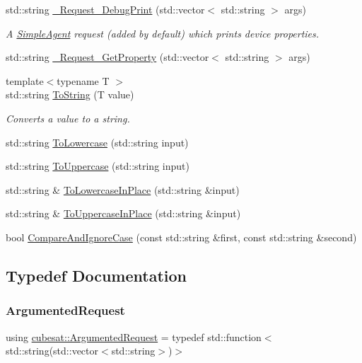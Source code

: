 \begin{DoxyCompactItemize}
std\+::string \hyperlink{namespacecubesat_a03e9fbf30b91d3d0992e8a539cbb855a}{\+\_\+\+Request\+\_\+\+Debug\+Print} (std\+::vector$<$ std\+::string $>$ args)
\begin{DoxyCompactList}\small\item\em A \hyperlink{classcubesat_1_1SimpleAgent}{Simple\+Agent} request (added by default) which prints device properties. \end{DoxyCompactList}\item 
std\+::string \hyperlink{namespacecubesat_a86fef60e77fb4edbec3c5bd8f99132b4}{\+\_\+\+Request\+\_\+\+Get\+Property} (std\+::vector$<$ std\+::string $>$ args)
\item 
{\footnotesize template$<$typename T $>$ }\\std\+::string \hyperlink{namespacecubesat_ac94d5b68f78cfaaa9c4cd769560a207f}{To\+String} (T value)
\begin{DoxyCompactList}\small\item\em Converts a value to a string. \end{DoxyCompactList}\item 
std\+::string \hyperlink{namespacecubesat_ad277b228035c9b8b9cfdafafe68c792d}{To\+Lowercase} (std\+::string input)
\item 
std\+::string \hyperlink{namespacecubesat_aae60436b7b01010bc7ae7fb4a26492d4}{To\+Uppercase} (std\+::string input)
\item 
std\+::string \& \hyperlink{namespacecubesat_a094d7c111486691d9cb4a96bb6c9844b}{To\+Lowercase\+In\+Place} (std\+::string \&input)
\item 
std\+::string \& \hyperlink{namespacecubesat_a752f5fe0a540f983cb1c67110ec6ff62}{To\+Uppercase\+In\+Place} (std\+::string \&input)
\item 
bool \hyperlink{namespacecubesat_aa791d6ee55d1ed9d85aa2b8c88ae9a9a}{Compare\+And\+Ignore\+Case} (const std\+::string \&first, const std\+::string \&second)
\end{DoxyCompactItemize}


\subsection{Typedef Documentation}
\mbox{\label{namespacecubesat_a4fb5bf4788a49408c2c979bb82ae4fe1}} 
\subsubsection{\texorpdfstring{Argumented\+Request}{ArgumentedRequest}}
{\footnotesize\ttfamily using \hyperlink{namespacecubesat_a4fb5bf4788a49408c2c979bb82ae4fe1}{cubesat\+::\+Argumented\+Request} = typedef std\+::function$<$std\+::string(std\+::vector$<$std\+::string$>$)$>$}


